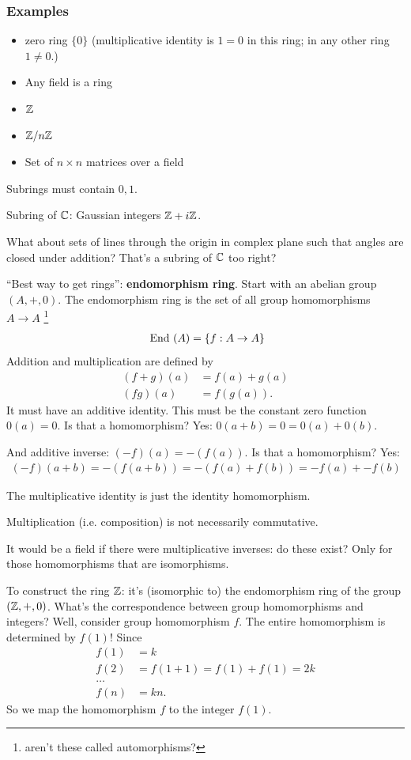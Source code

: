 \subsubsection{Examples}
\begin{itemize}
\item zero ring $\{0\}$ (multiplicative identity is $1 = 0$ in this ring; in
  any other ring $1 \neq 0$.)
\item Any field is a ring
\item $\mathbb{Z}$
\item $\mathbb{Z}/n\mathbb{Z}$
\item Set of $n \times n$ matrices over a field
\end{itemize}

Subrings must contain $0, 1$.

Subring of $\mathbb{C}$: Gaussian integers $\mathbb{Z} + i\mathbb{Z}$.

What about sets of lines through the origin in complex plane such that angles
are closed under addition? That's a subring of $\mathbb{C}$ too right?

``Best way to get rings'': \textbf{endomorphism ring}. Start with an abelian
group $(A, +, 0)$. The endomorphism ring is the set of all group homomorphisms
$A \to A$ \footnote{aren't these called automorphisms?}
\begin{align*}
~\text{End}~(A) = \{f: A \to A\}
\end{align*}
Addition and multiplication are defined by
\begin{align*}
  (f + g)(a) &= f(a) + g(a)\\
  (fg)(a)    &= f(g(a)).
\end{align*}
It must have an additive identity. This must be the constant zero function
$0(a) = 0$. Is that a homomorphism? Yes: $0(a + b) = 0 = 0(a) + 0(b)$.

And additive inverse: $(-f)(a) = -(f(a))$. Is that a homomorphism? Yes:
\begin{align*}
  (-f)(a + b) = -(f(a + b)) = -(f(a) + f(b)) = -f(a) + -f(b)
\end{align*}

The multiplicative identity is just the identity homomorphism.

Multiplication (i.e. composition) is not necessarily commutative.

It would be a field if there were multiplicative inverses: do these exist? Only
for those homomorphisms that are isomorphisms.

To construct the ring $\mathbb{Z}$: it's (isomorphic to) the endomorphism ring of the
group $(\mathbb{Z}, +, 0)$. What's the correspondence between group homomorphisms and
integers? Well, consider group homomorphism $f$. The entire homomorphism is
determined by $f(1)$! Since
\begin{align*}
  f(1) &= k\\
  f(2) &= f(1 + 1) = f(1) + f(1) = 2k\\
       \ldots\\
  f(n) &= kn.
\end{align*}
So we map the homomorphism $f$ to the integer $f(1)$.

